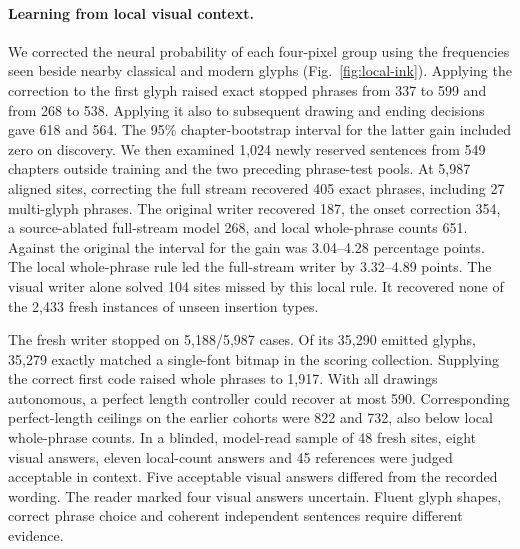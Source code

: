 \paragraph{Learning from local visual context.}
We corrected the neural probability of each four-pixel group using the frequencies seen beside nearby classical and modern glyphs (Fig.~\ref{fig:local-ink}). Applying the correction to the first glyph raised exact stopped phrases from 337 to 599 and from 268 to 538. Applying it also to subsequent drawing and ending decisions gave 618 and 564. The 95\% chapter-bootstrap interval for the latter gain included zero on discovery. We then examined 1,024 newly reserved sentences from 549 chapters outside training and the two preceding phrase-test pools. At 5,987 aligned sites, correcting the full stream recovered 405 exact phrases, including 27 multi-glyph phrases. The original writer recovered 187, the onset correction 354, a source-ablated full-stream model 268, and local whole-phrase counts 651. Against the original the interval for the gain was 3.04--4.28 percentage points. The local whole-phrase rule led the full-stream writer by 3.32--4.89 points. The visual writer alone solved 104 sites missed by this local rule. It recovered none of the 2,433 fresh instances of unseen insertion types.

The fresh writer stopped on 5,188/5,987 cases. Of its 35,290 emitted glyphs, 35,279 exactly matched a single-font bitmap in the scoring collection. Supplying the correct first code raised whole phrases to 1,917. With all drawings autonomous, a perfect length controller could recover at most 590. Corresponding perfect-length ceilings on the earlier cohorts were 822 and 732, also below local whole-phrase counts. In a blinded, model-read sample of 48 fresh sites, eight visual answers, eleven local-count answers and 45 references were judged acceptable in context. Five acceptable visual answers differed from the recorded wording. The reader marked four visual answers uncertain. Fluent glyph shapes, correct phrase choice and coherent independent sentences require different evidence.
